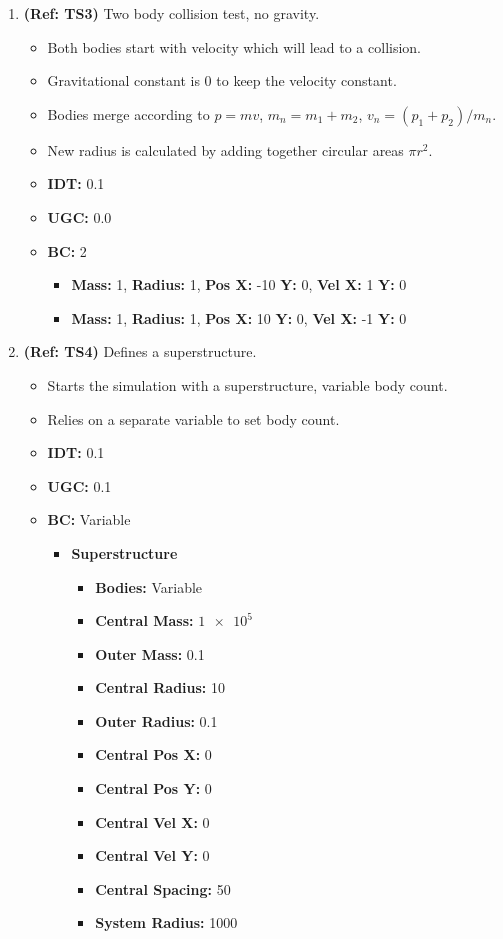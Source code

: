 \begin{enumerate}
\vspace{12pt}  
\item \textbf{(Ref: TS3)} Two body collision test, no gravity.
  \begin{itemize}
  \item Both bodies start with velocity which will lead to a collision.
  \item Gravitational constant is 0 to keep the velocity constant.
  \item Bodies merge according to $p=mv$, $m_n=m_1+m_2$, $v_n=(p_1+p_2)/m_n$.
  \item New radius is calculated by adding together circular areas $\pi r^2$.
  \item \textbf{IDT:} 0.1
  \item \textbf{UGC:} 0.0
  \item \textbf{BC:} 2
    \begin{itemize}
    \item \textbf{Mass:} 1, \textbf{Radius:} 1, \textbf{Pos X:} -10 \textbf{Y:} 0, \textbf{Vel X:} 1 \textbf{Y:} 0
    \item \textbf{Mass:} 1, \textbf{Radius:} 1, \textbf{Pos X:} 10 \textbf{Y:} 0, \textbf{Vel X:} -1 \textbf{Y:} 0
    \end{itemize}
  \end{itemize}
  
\vspace{12pt}  
\item \textbf{(Ref: TS4)} Defines a superstructure.
  \begin{itemize}
  \item Starts the simulation with a superstructure, variable body count.
  \item Relies on a separate variable to set body count.
  \item \textbf{IDT:} 0.1
  \item \textbf{UGC:} 0.1
  \item \textbf{BC:} Variable
    \begin{itemize}
    \item \textbf{Superstructure}
      \begin{itemize}
      \item \textbf{Bodies:} Variable
      \item \textbf{Central Mass:} $\num{1e5}$
      \item \textbf{Outer Mass:} 0.1
      \item \textbf{Central Radius:} 10
      \item \textbf{Outer Radius:} 0.1
      \item \textbf{Central Pos X:} 0
      \item \textbf{Central Pos Y:} 0
      \item \textbf{Central Vel X:} 0
      \item \textbf{Central Vel Y:} 0
      \item \textbf{Central Spacing:} 50
      \item \textbf{System Radius:} 1000
      \end{itemize}
    \end{itemize}
  \end{itemize}
  

\end{enumerate}
